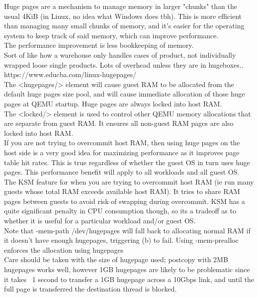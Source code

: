 \documentclass[11pt, a4paper, oneside]{article}
\theoremstyle{definition}
\begin{document}
Huge pages are a mechanism to manage memory in larger "chunks" than the usual 4KiB (in Linux, no idea what Windows does tbh). This is more efficient than managing many small chunks of memory, and it's easier for the operating system to keep track of said memory, which can improve performance.\\

The performance improvement is less bookkeeping of memory.\\
Sort of like how a warehouse only handles cases of product, not individually wrapped loose single products. Lots of overhead unless they are in hugeboxes..\\

https://www.educba.com/linux-hugepages/\\

The <hugepages/> element will cause guest RAM to be allocated from the default huge pages size pool, and will cause immediate allocation of those huge pages at QEMU startup. Huge pages are always locked into host RAM.\\

The <locked/> element is used to control other QEMU memory allocations that are separate from guest RAM. It ensures all non-guest RAM pages are also locked into host RAM.\\

If you are not trying to overcommit host RAM, then using huge pages on the host side is a very good idea for maximizing performance as it improves page table hit rates. This is true regardless of whether the guest OS in turn uses huge pages. This performance benefit will apply to all workloads and all guest OS.\\

The KSM feature for when you are trying to overcommit host RAM (ie run many guests whose total RAM exceeds available host RAM). It tries to share RAM pages between guests to avoid risk of swapping during overcommit. KSM has a quite significant penalty in CPU consumption though, so its a tradeoff as to whether it is useful for a particular workload and/or guest OS.\\

Note that -mem-path /dev/hugepages will fall back to allocating normal RAM if it doesn’t have enough hugepages, triggering (b) to fail. Using -mem-prealloc enforces the allocation using hugepages\\

Care should be taken with the size of hugepage used; postcopy with 2MB hugepages works well, however 1GB hugepages are likely to be problematic since it takes ~1 second to transfer a 1GB hugepage across a 10Gbps link, and until the full page is transferred the destination thread is blocked.\\
\end{document}
